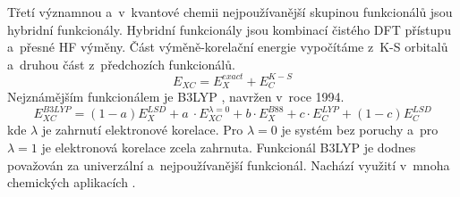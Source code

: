 \documentclass[
digital, %
table,   %
nolof,     %
nolot,     %
oneside,
]{fithesis3}
\begin{document}
Třetí významnou a~v~kvantové chemii nejpoužívanější skupinou funkcionálů jsou hybridní funkcionály. Hybridní funkcionály jsou kombinací čistého DFT přístupu a~přesné HF výměny. Část výměně-korelační energie vypočítáme z~K-S orbitalů a~druhou část z~předchozích funkcionálů.
\begin{equation}
E_{XC} = E_{X}^{exact} + E_C^{K-S}
\end{equation}
Nejznámějším funkcionálem je B3LYP \cite{b3lyp}, navržen v~roce 1994.
\begin{equation}
E_{XC}^{B3LYP} = (1-a)E_{X}^{LSD} + a~\cdot E_{XC}^{\lambda = 0} + b \cdot E_{X}^{B88} + c \cdot E_{C}^{LYP} + (1-c)E_{C}^{LSD}
\end{equation}
kde $\lambda$ je zahrnutí elektronové korelace. Pro $\lambda=0$ je systém bez poruchy a~pro $\lambda=1$ je elektronová korelace zcela zahrnuta. Funkcionál B3LYP je dodnes považován za univerzální a~nejpoužívanější funkcionál. Nachází využití v~mnoha chemických aplikacích \cite{koch2000chemist}.
\end{document}
